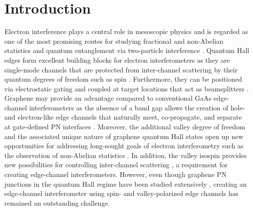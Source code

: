 \documentclass[%
reprint,amsmath,amssymb,aps,prl,superscriptaddress,
twocolumn
]{revtex4-1}
\begin{document}
	\section{Introduction}
	Electron interference plays a central role in mesoscopic physics \cite{Datta1995, Chamon1997, Ji2003} and is regarded as one of the most promising routes for studying fractional and non-Abelian statistics \cite{Law2006, Feldman2006} and quantum entanglement via two-particle interference \cite{Samuelsson2004, Yurke1992}. Quantum Hall edges form excellent building blocks for electron interferometers as they are single-mode channels that are protected from inter-channel scattering by their quantum degrees of freedom such as spin \cite{Datta1995, Amet2014}. Furthermore, they can be positioned via electrostatic gating and coupled at target locations that act as beamsplitters \cite{Chamon1997,Ji2003}. Graphene may provide an advantage compared to conventional GaAs edge-channel interferometers \cite{Neder2006, Neder2007, Roulleau2007, Bieri2009} as the absence of a band gap allows the creation of hole- and electron-like edge channels that naturally meet, co-propagate, and separate at gate-defined PN interfaces \cite{Abanin2007, Williams2007}. Moreover, the additional valley degree of freedom and the associated unique nature of graphene quantum Hall states \cite{CastroNeto2009, Young2012} open up new opportunities for addressing long-sought goals of electron interferometry such as the observation of non-Abelian statistics \cite{Zibrov2017}. In addition, the valley isospin provides new possibilities for controlling inter-channel scattering \cite{Tworzydlo2007}, a requirement for creating edge-channel interferometers. However, even though graphene PN junctions in the quantum Hall regime have been studied extensively \cite{Amet2014, Abanin2007, Williams2007, Ozyilmaz2007, Velasco2009, Matsuo2015, Machida2015, Tovari2016}, creating an edge-channel interferometer using spin- and valley-polarized edge channels has remained an outstanding challenge. 
	
\end{document}

